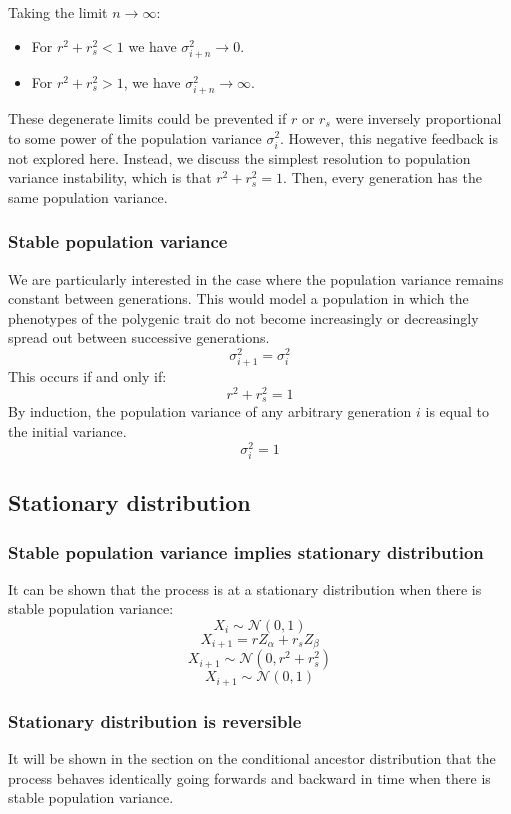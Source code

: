 \documentclass[a4paper,11pt]{article} %
\begin{document}
Taking the limit $n \rightarrow \infty$: 
\begin{itemize}
\item For $r^2+r_s^2 < 1$ we have $\sigma_{i+n}^2 \rightarrow 0$.
\item For  $r^2+r_s^2 > 1$, we have $\sigma_{i+n}^2 \rightarrow \infty$. 
\end{itemize}

These degenerate limits could be prevented if $r$ or $r_s$ were inversely proportional to some power of the population variance $\sigma_i^2$. However, this negative feedback is not explored here. Instead, we discuss the simplest resolution to population variance instability, which is that $r^2+r_s^2 = 1$. Then, every generation has the same population variance.

\subsubsection*{Stable population variance}
We are particularly interested in the case where the population variance remains constant between generations. This would model a population in which the phenotypes of the polygenic trait do not become increasingly or decreasingly spread out between successive generations. 
$$\sigma_{i+1}^2 = \sigma_i^2$$
This occurs if and only if:
$$r^2+r_s^2 = 1$$
%
By induction, the population variance of any arbitrary generation $i$ is equal to the initial variance. 
$$\sigma_i^2 = 1$$



\subsection{Stationary distribution}

\subsubsection*{Stable population variance implies stationary distribution}
It can be shown that the process is at a stationary distribution when there is stable population variance:
$$X_i \sim \mathcal{N}(0, 1)$$
$$X_{i+1} = r Z_\alpha + r_s Z_\beta$$
$$X_{i+1} \sim \mathcal{N}(0, r^2+r_s^2)$$
$$X_{i+1} \sim \mathcal{N}(0, 1)$$

\subsubsection*{Stationary distribution is reversible}
It will be shown in the section on the conditional ancestor distribution that the process behaves identically going forwards and backward in time when there is stable population variance.
\end{document}
